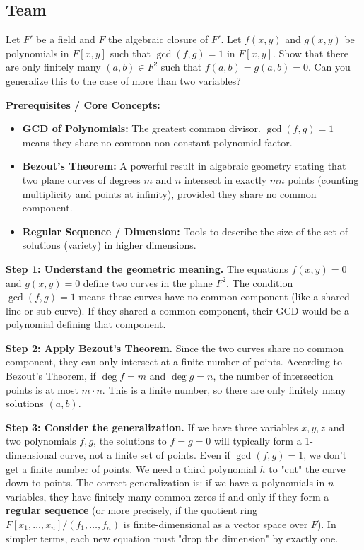 \subsection*{Team}
\begin{exercise}
\label{algebra:2011:7}
Let $F'$ be a field and $F$ the algebraic closure of $F'$. Let $f(x, y)$ and $g(x, y)$ be polynomials in $F[x, y]$ such that $\gcd(f, g) = 1$ in $F[x, y]$. Show that there are only finitely many $(a, b) \in F^2$ such that $f(a, b) = g(a, b) = 0$. Can you generalize this to the case of more than two variables?
\end{exercise}

\begin{solution}
\textbf{Prerequisites / Core Concepts:}
\begin{itemize}
    \item \textbf{GCD of Polynomials:} The greatest common divisor. $\gcd(f, g)=1$ means they share no common non-constant polynomial factor.
    \item \textbf{Bezout's Theorem:} A powerful result in algebraic geometry stating that two plane curves of degrees $m$ and $n$ intersect in exactly $mn$ points (counting multiplicity and points at infinity), provided they share no common component.
    \item \textbf{Regular Sequence / Dimension:} Tools to describe the size of the set of solutions (variety) in higher dimensions.
\end{itemize}

\textbf{Step 1: Understand the geometric meaning.}
The equations $f(x, y) = 0$ and $g(x, y) = 0$ define two curves in the plane $F^2$.
The condition $\gcd(f, g) = 1$ means these curves have no common component (like a shared line or sub-curve).
If they shared a common component, their GCD would be a polynomial defining that component.

\textbf{Step 2: Apply Bezout's Theorem.}
Since the two curves share no common component, they can only intersect at a finite number of points.
According to Bezout's Theorem, if $\deg f = m$ and $\deg g = n$, the number of intersection points is at most $m \cdot n$.
This is a finite number, so there are only finitely many solutions $(a, b)$.

\textbf{Step 3: Consider the generalization.}
If we have three variables $x, y, z$ and two polynomials $f, g$, the solutions to $f=g=0$ will typically form a 1-dimensional curve, not a finite set of points.
Even if $\gcd(f, g) = 1$, we don't get a finite number of points. We need a third polynomial $h$ to "cut" the curve down to points.
The correct generalization is: if we have $n$ polynomials in $n$ variables, they have finitely many common zeros if and only if they form a \textbf{regular sequence} (or more precisely, if the quotient ring $F[x_1, \dots, x_n] / (f_1, \dots, f_n)$ is finite-dimensional as a vector space over $F$). 
In simpler terms, each new equation must "drop the dimension" by exactly one.
\end{solution}

